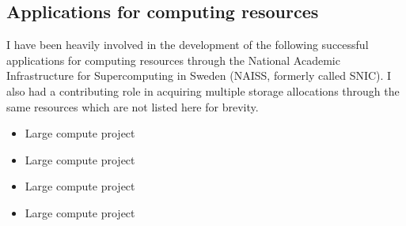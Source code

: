 


\subsection{Applications for computing resources}{}
I have been heavily involved in the development of the following successful applications for computing resources through the National Academic Infrastructure for Supercomputing in Sweden (NAISS, formerly called SNIC). I also had a contributing role in acquiring multiple storage allocations through the same resources which are not listed here for brevity.
\begin{itemize}[topsep=5pt]
    \item Large compute project

    \item Large compute project
    
    \item Large compute project

    \item Large compute project
\end{itemize}


